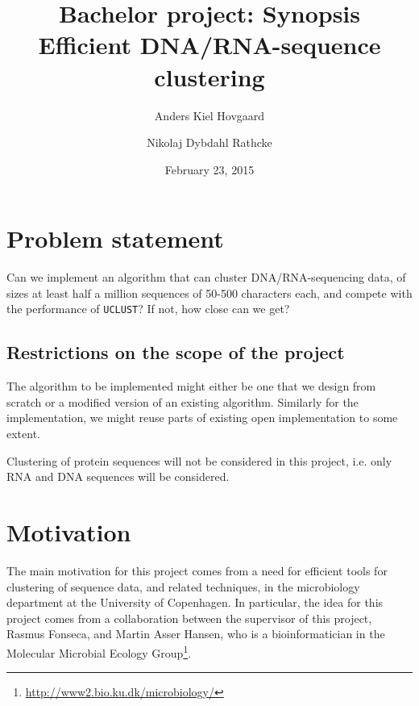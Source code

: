 \documentclass[11pt,a4paper]{article}
\title{Bachelor project: Synopsis \\
       \vspace{2mm}
       {\LARGE Efficient DNA/RNA-sequence clustering}} %
\author{Anders Kiel Hovgaard \and Nikolaj Dybdahl Rathcke}
\date{February 23, 2015}
\begin{document}
\maketitle
\thispagestyle{fancy}

\section{Problem statement}
Can we implement an algorithm that can cluster DNA/RNA-sequencing data, of
sizes at least half a million sequences of 50-500 characters each, and compete
with the performance of \texttt{UCLUST}? If not, how close can we get?



\subsection{Restrictions on the scope of the project}

The algorithm to be implemented might either be one that we design from scratch
or a modified version of an existing algorithm. Similarly for the
implementation, we might reuse parts of existing open implementation to some
extent.

Clustering of protein sequences will not be considered in this project, i.e.
only RNA and DNA sequences will be considered.


\section{Motivation}
The main motivation for this project comes from a need for efficient tools for
clustering of sequence data, and related techniques, in the microbiology
department at the University of Copenhagen. In particular, the idea for this
project comes from a collaboration between the supervisor of this project,
Rasmus Fonseca, and Martin Asser Hansen, who is a bioinformatician in the
Molecular Microbial Ecology
Group\footnote{\url{http://www2.bio.ku.dk/microbiology/}}.
\end{document}
